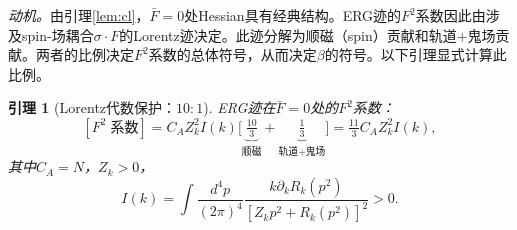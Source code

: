 \documentclass[12pt,a4paper]{article}
\theoremstyle{plain}
\newtheorem{lemma}[theorem]{引理}
\theoremstyle{definition}
\theoremstyle{remark}
\begin{document}
\textit{动机。}由引理\ref{lem:cl}，$\bar{F}=0$处Hessian具有经典结构。ERG迹的$F^2$系数因此由涉及spin-场耦合$\sigma\cdot F$的Lorentz迹决定。此迹分解为顺磁（spin）贡献和轨道$+$鬼场贡献。两者的比例决定$F^2$系数的总体符号，从而决定$\beta$的符号。以下引理显式计算此比例。

\begin{lemma}[Lorentz代数保护：$10{:}1$]\label{lem:101}
ERG迹在$\bar{F}=0$处的$F^2$系数：
\begin{equation}\label{eq:F2decomp}
[F^2\;\text{系数}] = C_AZ_k^2I(k)\Big[\underbrace{\tfrac{10}{3}}_{\text{顺磁}}+\underbrace{\tfrac{1}{3}}_{\text{轨道+鬼场}}\Big] = \tfrac{11}{3}C_AZ_k^2I(k),
\end{equation}
其中$C_A=N$，$Z_k>0$，
\begin{equation}\label{eq:Ik}
I(k) = \int\frac{d^4p}{(2\pi)^4}\frac{k\partial_kR_k(p^2)}{[Z_kp^2+R_k(p^2)]^2} > 0.
\end{equation}
\end{lemma}
\end{document}
